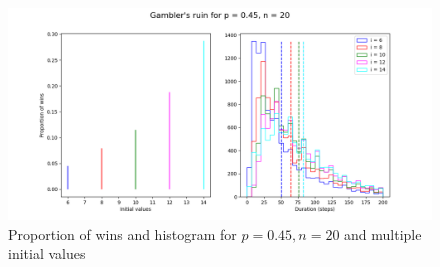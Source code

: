 \begin{figure}
\begin{center}
\includegraphics[width=\textwidth]{gamblers_ruin-02}
\caption{Proportion of wins and histogram for $p=0.45, n=20$ and multiple initial values}\label{f.gambler-hist2}
\end{center}
\end{figure}
